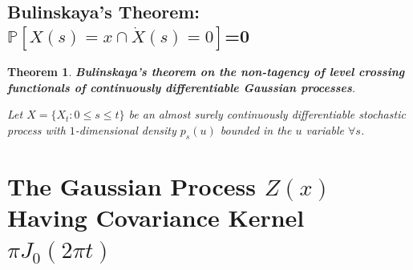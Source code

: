 \documentclass{article}
\newcommand{\tmstrong}[1]{\textbf{#1}}
\newtheorem{theorem}{Theorem}
\begin{document}
\subsection{Bulinskaya's Theorem: $\mathbb{P} [X (s) = x \cap \dot{X} (s) =
0]$=0}

\begin{theorem}
  {\tmstrong{Bulinskaya's theorem on the non-tagency of level crossing
  functionals of continuously differentiable Gaussian processes}}.
  
  Let $X = \{ X_t : 0 \leqslant s \leqslant t \}$ be an almost surely
  continuously differentiable stochastic process with $1$-dimensional density
  $p_s (u)$ bounded in the $u$ variable $\forall s$. \ {\cite[Theorem
  1.1]{GaussianProcessLevelCrossings}}
\end{theorem}

\section{The Gaussian Process $Z (x)$ Having Covariance Kernel $\pi J_0 (2 \pi
t)$}
\end{document}
